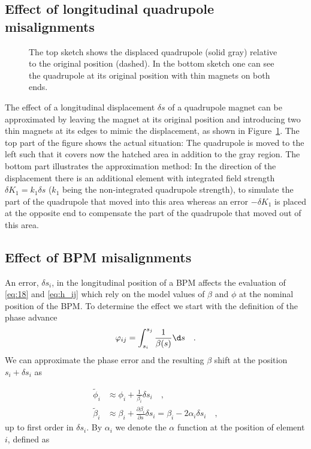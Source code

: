\subsection{Effect of longitudinal quadrupole misalignments}

\begin{figure}
    \centering
    
	\caption{
        The top sketch shows the displaced quadrupole (solid gray) relative to the original position
        (dashed). In the bottom sketch one can see the quadrupole at its original position with thin
        magnets on both ends.
    }
	\label{fig:quadmisal}
\end{figure} 

The effect of a longitudinal displacement $ \delta s $ of a quadrupole magnet can be approximated by
leaving the magnet at its original position and introducing two thin magnets at its edges to mimic
the displacement, as shown in Figure~\ref{fig:quadmisal}.
The top part of the figure shows the actual situation:
The quadrupole is moved to the left such that it covers now the hatched area in addition to the gray
region. 
The bottom part illustrates the approximation method:
In the direction of the displacement there is an additional element with integrated field strength
$ \delta K_1 = k_1\delta s $ ($k_1$ being the 
non-integrated quadrupole strength), to simulate the part of the quadrupole that moved into this area
whereas an error 
$ -\delta K_1 $ is placed at the opposite end to compensate the part of the quadrupole that moved out
of this area.



\subsection{Effect of BPM misalignments}

An error, $ \delta s_i $, in the longitudinal position of
a BPM affects the evaluation of \eqref{eq:18} and \eqref{eq:h_ij} which rely on the model
values of $ \beta $ and $ \phi $ at the nominal position of the BPM.
To determine the effect we start
with the definition of the phase advance
\begin{equation}
\phi_{ij} = \int_{s_i}^{s_j} \frac{1}{\beta(s)}\d s\quad .
\end{equation}
We can approximate the phase error and the resulting $\beta$ shift at the position $s_i + \delta s_i$ as

\begin{align}
\tilde{\phi}_i &\approx \phi_i + \frac{1}{\beta_i}\delta s_i\quad , 
\label{eq:Dphi} \\
\tilde{\beta}_i &\approx \beta_i + \frac{\partial \beta_i}{\partial s} \delta s_i  = \beta_i - 2\alpha_i \delta s_i \quad , \label{eq:Dbeta}
\end{align}
up to first order in $ \delta s_i $. By $ \alpha_i $ we denote the $ \alpha $ function at the position
of element $ i $, defined as 

